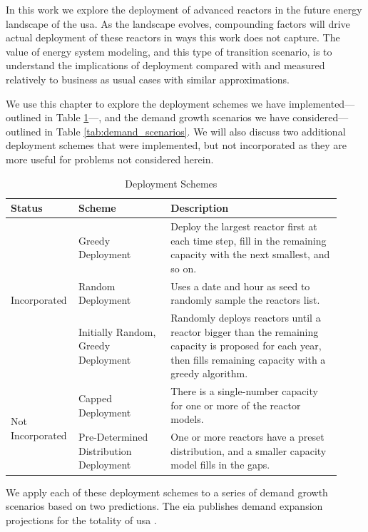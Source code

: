 In this work we explore the deployment of advanced reactors in the future energy landscape of the \gls{usa}. As the landscape evolves, compounding factors will drive actual deployment of these reactors in ways this work does not capture. The value of energy system modeling, and this type of transition scenario, is to understand the implications of deployment compared with and measured relatively to business as usual cases with similar approximations.

We use this chapter to explore the deployment schemes we have implemented---outlined in Table \ref{tab:deployment_schemes}---, and the demand growth scenarios we have considered---outlined in Table \ref{tab:demand_scenarios}. We will also discuss two additional deployment schemes that were implemented, but not incorporated as they are more useful for problems not considered herein.

\begin{table}[htbp]
    \centering
    \caption{Deployment Schemes}
    \label{tab:deployment_schemes}
    \begin{tabular}{p{0.15\linewidth} p{0.27\linewidth} p{0.50\linewidth}}
        \hline
        \textbf{Status} & \textbf{Scheme} & \textbf{Description} \\
        \hline
        \multirow{3}{*}{Incorporated} & Greedy Deployment & Deploy the largest reactor first at each time step, fill in the remaining capacity with the next smallest, and so on. \\
        & Random Deployment & Uses a date and hour as seed to randomly sample the reactors list. \\
        & Initially Random, Greedy Deployment & Randomly deploys reactors until a reactor bigger than the remaining capacity is proposed for each year, then fills remaining capacity with a greedy algorithm. \\
        \hline
        \multirow{2}{*}{Not Incorporated} & Capped Deployment & There is a single-number capacity for one or more of the reactor models. \\
        & Pre-Determined Distribution Deployment & One or more reactors have a preset distribution, and a smaller capacity model fills in the gaps. \\
        \hline
    \end{tabular}
\end{table}

We apply each of these deployment schemes to a series of demand growth scenarios based on two predictions. The \gls{eia} publishes demand expansion projections for the totality of \gls{usa} .

